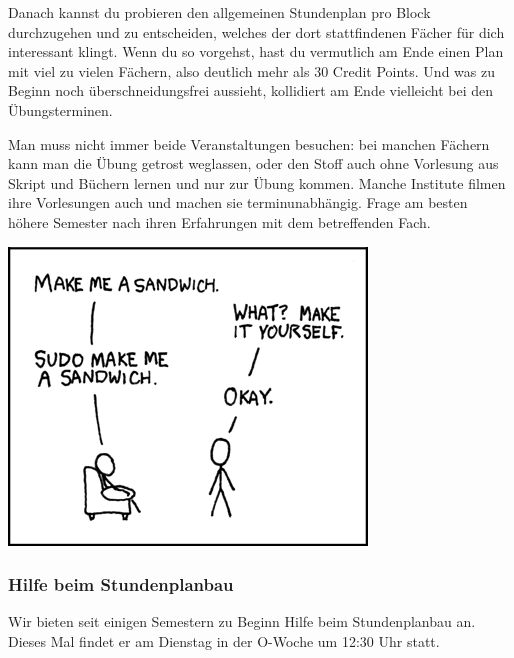 \begin{multicols}{2}
		Danach kannst du probieren den allgemeinen Stundenplan pro Block durchzugehen und zu entscheiden, welches der dort stattfindenen Fächer für dich interessant klingt. Wenn du so vorgehst, hast du vermutlich am Ende einen Plan mit viel zu vielen Fächern, also deutlich mehr als 30 Credit Points. Und was zu Beginn noch überschneidungsfrei aussieht, kollidiert am Ende vielleicht bei den Übungsterminen. 

		Man muss nicht immer beide Veranstaltungen besuchen: bei manchen Fächern kann man die Übung getrost weglassen, oder den Stoff auch ohne Vorlesung aus Skript und Büchern lernen und nur zur Übung kommen. Manche Institute filmen ihre Vorlesungen auch und machen sie terminunabhängig. Frage am besten höhere Semester nach ihren Erfahrungen mit dem betreffenden Fach.

		\vspace{0.5cm}
		\includegraphics[totalheight=6cm]{bilder/XKCD/sandwich}
	\subsubsection{Hilfe beim Stundenplanbau}
		Wir bieten seit einigen Semestern zu Beginn Hilfe beim Stundenplanbau an. Dieses Mal findet er am Dienstag in der O-Woche um 12:30 Uhr statt. 
\end{multicols}
